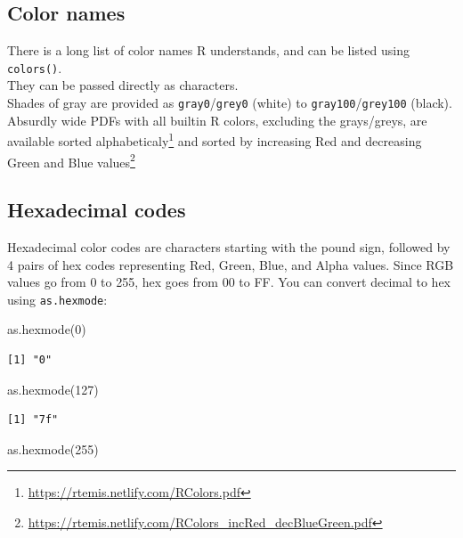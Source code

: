 \documentclass[
]{book}
\newenvironment{Shaded}{\begin{snugshade}}{\end{snugshade}}
\newcommand{\DecValTok}[1]{\textcolor[rgb]{0.00,0.00,0.81}{#1}}
\newcommand{\FunctionTok}[1]{\textcolor[rgb]{0.00,0.00,0.00}{#1}}
\newcommand{\NormalTok}[1]{#1}
\renewcommand{\href}[2]{#2\footnote{\url{#1}}}
\begin{document}
\hypertarget{color-names}{%
\subsection{Color names}\label{color-names}}

There is a long list of color names R understands, and can be listed using \texttt{colors()}.\\
They can be passed directly as characters.\\
Shades of gray are provided as \texttt{gray0}/\texttt{grey0} (white) to \texttt{gray100}/\texttt{grey100} (black).\\
Absurdly wide PDFs with all builtin R colors, excluding the grays/greys, are available sorted \href{https://rtemis.netlify.com/RColors.pdf}{alphabeticaly} and sorted by \href{https://rtemis.netlify.com/RColors_incRed_decBlueGreen.pdf}{increasing Red and decreasing Green and Blue values}

\hypertarget{hexadecimal-codes}{%
\subsection{Hexadecimal codes}\label{hexadecimal-codes}}

Hexadecimal color codes are characters starting with the pound sign, followed by 4 pairs of hex codes representing Red, Green, Blue, and Alpha values. Since RGB values go from 0 to 255, hex goes from 00 to FF. You can convert decimal to hex using \texttt{as.hexmode}:

\begin{Shaded}
\begin{Highlighting}[]
\FunctionTok{as.hexmode}\NormalTok{(}\DecValTok{0}\NormalTok{)}
\end{Highlighting}
\end{Shaded}

\begin{verbatim}
[1] "0"
\end{verbatim}

\begin{Shaded}
\begin{Highlighting}[]
\FunctionTok{as.hexmode}\NormalTok{(}\DecValTok{127}\NormalTok{)}
\end{Highlighting}
\end{Shaded}

\begin{verbatim}
[1] "7f"
\end{verbatim}

\begin{Shaded}
\begin{Highlighting}[]
\FunctionTok{as.hexmode}\NormalTok{(}\DecValTok{255}\NormalTok{)}
\end{Highlighting}
\end{Shaded}
\end{document}
